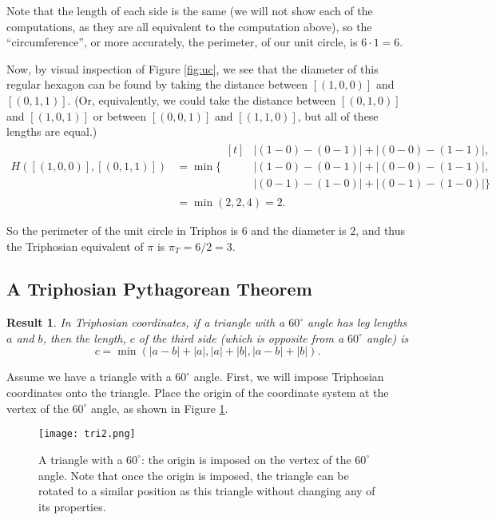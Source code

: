 \documentclass[11pt]{article}
\theoremstyle{definition}
\theoremstyle{plain}
\newtheorem{result}{Result}
\theoremstyle{remark}
\begin{document}
	Note that the length of each side is the same (we will not show each of the
	computations, as they are all equivalent to the computation above), so the
	``circumference'', or more accurately, the perimeter, of our unit circle,
	is \(6 \cdot 1 = 6\).

	Now, by visual inspection of Figure \ref{fig:uc}, we see that the diameter
	of this regular hexagon can be found by taking the distance between
	\([(1,0,0)]\) and \([(0,1,1)]\). (Or, equivalently, we could take the
	distance between \([(0,1,0)]\) and \([(1,0,1)]\) or between \([(0,0,1)]\)
	and \([(1,1,0)]\), but all of these lengths are equal.)
	\begin{align*}
		H([(1,0,0)], [(0,1,1)]) &= \min\{
		\begin{aligned}[t]
			&|(1 - 0) - (0 - 1)| + |(0 - 0) - (1 - 1)|, \\
			&|(1 - 0) - (0 - 1)| + |(0 - 0) - (1 - 1)|, \\
			&|(0 - 1) - (1 - 0)| + |(0 - 1) - (1 - 0)| \}
		\end{aligned} \\
		&= \min{(2,2,4)} = 2.
	\end{align*}

	So the perimeter of the unit circle in Triphos is \(6\) and the diameter is
	\(2\), and thus the Triphosian equivalent of \(\pi\) is \(\pi_T = 6/2 = 3\).


	\subsection{A Triphosian Pythagorean Theorem}

	\begin{result}
		In Triphosian coordinates, if a triangle with a \(60^{\circ}\) angle
		has leg lengths \(a\) and \(b\), then the length, \(c\) of the third
		side (which is opposite from a \(60^{\circ}\) angle) is \[c = \min
		(\left| a-b\right| +\left| a\right| ,\left| a\right| +\left| b\right|
		,\left| a-b\right| +\left|
		b\right| ).\]
	\end{result}

	Assume we have a triangle with a \(60^{\circ}\) angle. First, we will
	impose Triphosian coordinates onto the triangle. Place the origin of the
	coordinate system at the vertex of the \(60^{\circ}\) angle, as shown in
	Figure \ref{fig:tri}.

	\begin{figure}[htbp]
		\centering
		\texttt{[image: tri2.png]}
		\caption{A triangle with a \(60^{\circ}\): the origin is imposed on the
		vertex of the \(60^{\circ}\) angle. Note that once the origin is
		imposed, the triangle can be rotated to a similar position as this
		triangle without changing any of its properties.}
		\label{fig:tri}
	\end{figure}
\end{document}
